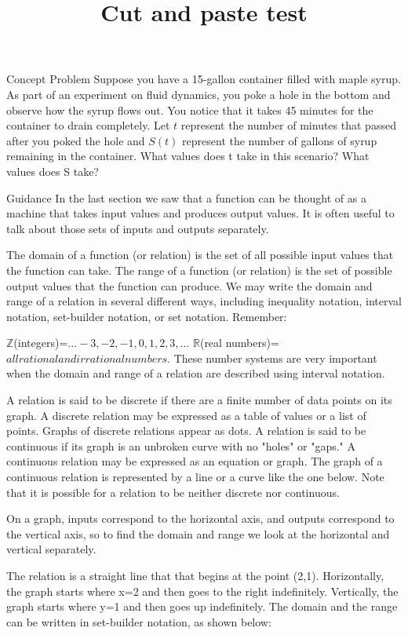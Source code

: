 \documentclass{ximera}
\title{Cut and paste test}
\begin{document}
Concept Problem
Suppose you have a 15-gallon container filled with maple syrup. As part of an experiment on fluid dynamics, you poke a hole in the bottom and observe how the syrup flows out. You notice that it takes 45 minutes for the container to drain completely. Let $t$ represent the number of minutes that passed after you poked the hole and $S(t)$ represent the number of gallons of syrup remaining in the container. What values does t take in this scenario? What values does S take?

Guidance
In the last section we saw that a function can be thought of as a machine that takes input values and produces output values. It is often useful to talk about those sets of inputs and outputs separately.

The domain of a function (or relation) is the set of all possible input values that the function can take. The range of a function (or relation) is the set of possible output values that the function can produce. We may write the domain and range of a relation in several different ways, including inequality notation, interval notation, set-builder notation, or set notation. Remember:

$\mathbb{Z}$(integers)=${...−3,−2,−1,0,1,2,3,…}$
$\mathbb{R}$(real numbers)=${all rational and irrational numbers}$.
These number systems are very important when the domain and range of a relation are described using interval notation.

A relation is said to be discrete if there are a finite number of data points on its graph. A discrete relation may be expressed as a table of values or a list of points. Graphs of discrete relations appear as dots. A relation is said to be continuous if its graph is an unbroken curve with no "holes" or "gaps." A continuous relation may be expressed as an equation or graph. The graph of a continuous relation is represented by a line or a curve like the one below. Note that it is possible for a relation to be neither discrete nor continuous.

On a graph, inputs correspond to the horizontal axis, and outputs correspond to the vertical axis, so to find the domain and range we look at the horizontal and vertical separately.

 

The relation is a straight line that that begins at the point (2,1). Horizontally, the graph starts where x=2 and then goes to the right indefinitely. Vertically, the graph starts where y=1 and then goes up indefinitely. The domain and the range can be written in set-builder notation, as shown below:
\end{document}
